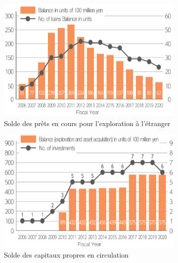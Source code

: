 \begin{figure}[!b]
    \centering
    \begin{subfigure}[b]{0.31\textwidth}
        \centering
         \includegraphics[width=\textwidth]{Images/Metals_policies/JOGMEC1.png}
         \caption{Solde des prêts en cours pour l'exploration à l'étranger}
         \label{fig:JOGMEC1}
    \end{subfigure}
    \hfill
    \begin{subfigure}[b]{0.31\textwidth}
        \centering
         \includegraphics[width=\textwidth]{Images/Metals_policies/JOGMEC2.png}
         \caption{Solde des capitaux propres en circulation}
         \label{fig:JOGMEC2}
    \end{subfigure}
    \hfill
    \begin{subfigure}[b]{0.31\textwidth}
        \centering

\end{subfigure}
\end{figure}
